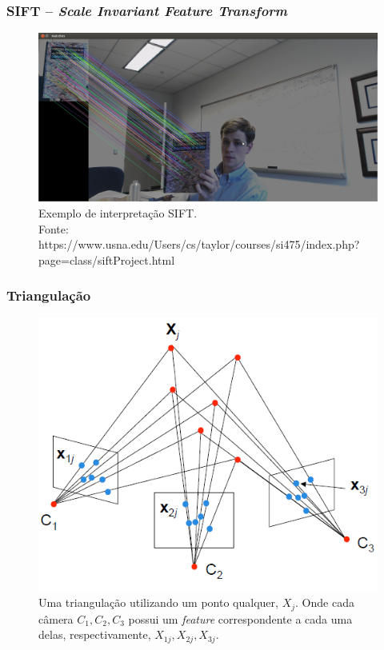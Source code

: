 \documentclass[table, usenames, svgnames, xcolor=dvipsnames]{beamer}
\begin{document}
\begin{frame}
\frametitle{\textbf{SIFT -- \emph{Scale Invariant Feature Transform}}}
	\begin{center}		
		\begin{figure}[!h]
			\centering
			\includegraphics[width=1\linewidth]{figs/sift1.png}
			\caption{%
				Exemplo de interpretação SIFT. \\
			\tiny{Fonte: https://www.usna.edu/Users/cs/taylor/courses/si475/index.php?page=class/siftProject.html}
			}
		\end{figure}
	\end{center}
\end{frame}

\begin{frame}
\frametitle{\textbf{Triangulação}}
	\begin{center}
		\begin{figure} [!h]
	\centering
	\includegraphics[width=0.45\linewidth]{figs/triangulacao.png}
	\caption{%
	Uma triangulação utilizando um ponto qualquer, $X_j$. Onde cada câmera $C_1, C_2, C_3$ possui um \emph{feature} correspondente a cada uma delas, respectivamente, $X_{1j}, X_{2j}, X_{3j}$.
	}\label{fig:triangulacao}
\end{figure}
	\end{center}
\end{frame}

\end{document}
